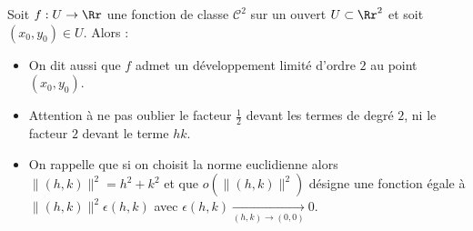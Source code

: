 \begin{theoreme}{}{}    
Soit $f:U \to \Rr$ une fonction de classe $\mathcal{C}^2$ sur un ouvert $U\subset \Rr^2$ et soit $(x_0,y_0)\in U$.  Alors :
   
\end{theoreme}


\begin{itemize}
    \item On dit aussi que $f$ admet un développement limité d'ordre $2$ au point $(x_0,y_0)$.

    \item Attention à ne pas oublier le facteur $\frac12$ devant les termes de degré $2$, ni le facteur $2$ devant le terme $hk$.
    
    \item On rappelle que si on choisit la norme euclidienne alors $\|(h,k)\|^2 = h^2+k^2$ et que $o\left(\|(h,k)\|^2\right)$ désigne une fonction égale à $\|(h,k)\|^2 \epsilon(h,k)$ avec $\epsilon(h,k) 
    \xrightarrow[(h,k)\to (0,0)]{} 0.$


\end{itemize}




